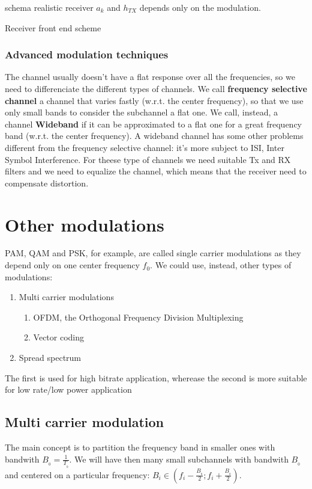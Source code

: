 schema realistic receiver
$a_k$ and $h_{TX}$ depends only on the modulation.

Receiver front end scheme

\subsubsection{Advanced modulation techniques}
The channel usually doesn't have a flat response over all the frequencies, so we need to differenciate the different types of channels. We call \textbf{ frequency selective channel} a channel that varies fastly (w.r.t. the center frequency), so that we use only small bands to consider the subchannel a flat one. We call, instead, a channel \textbf{Wideband} if it can be approximated
to a flat one for a great frequency band (w.r.t. the center frequency). A wideband channel has some other problems different from the frequency selective channel: it's more subject to ISI, Inter Symbol Interference. For theese type of channels we need suitable Tx and RX filters and we need to equalize the channel, which means that the receiver need to compensate distortion.

\section{Other modulations}
PAM, QAM and PSK, for example, are called single carrier modulations as they depend only on one center frequency $f_0$. We could use, instead, other types of modulations:
\begin{enumerate}
  \item Multi carrier modulations

\begin{enumerate}
  \item OFDM, the Orthogonal Frequency Division Multiplexing
  \item Vector coding
\end{enumerate}
\item Spread spectrum
\end{enumerate}

The first is used for high bitrate application, wherease the second is more suitable for low rate/low power application

\subsection{Multi carrier modulation}
The main concept is to partition the frequency band in smaller ones with bandwith $B_{_0}=\frac{1}{T_{_0}}$. We will have then many small subchannels with bandwith $B_{_0}$ and centered on a particular frequency: $B_i \in \left(f_i - \frac{B_{_0}}{2};f_i + \frac{B_{_0}}{2}\right)$.


